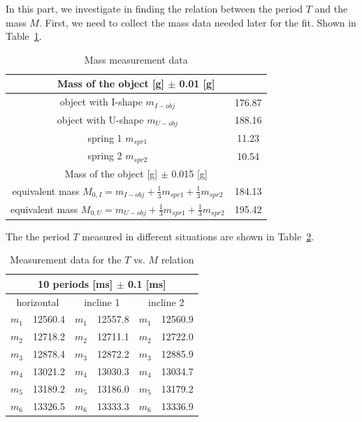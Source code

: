 In this part, we investigate in finding the relation between the period $T$ and 
the mass $M$.
First, we need to collect the mass data needed later for the fit. Shown in Table~\ref{dataMass}.

\begin{table}[H]
	\centering
	\begin{tabular}{|c|c|}
	\hline
	\multicolumn{2}{|c|}{Mass of the object [g] $\pm$ 0.01 [g]} \\ \hline
	object with I-shape $m_{I-obj}$  & 176.87 \\ \hline
	object with U-shape $m_{U-obj}$  & 188.16 \\ \hline
	spring 1 			$m_{spr1}$ & 11.23 \\ \hline
	spring 2 			$m_{spr2}$ & 10.54 \\ \hline \hline
	\multicolumn{2}{|c|}{Mass of the object [g] $\pm$ 0.015 [g]} \\ \hline 
	equivalent mass		$M_{0,I} = m_{I-obj} + \frac{1}{3} m_{spr1} + \frac{1}{3} m_{spr2} $ & 184.13 \\ \hline 
	equivalent mass		$M_{0,U} = m_{U-obj} + \frac{1}{3} m_{spr1} + \frac{1}{3} m_{spr2} $ & 195.42 \\ \hline 
	\end{tabular}
	\caption{Mass measurement data}
\label{dataMass}
\end{table}


The the period $T$ measured in different situations are shown in Table~\ref{dataTime}.

\begin{table}[H]
	\centering
	\begin{tabular}{|c|c||c|c||c|c|}
	\hline
	\multicolumn{6}{|c|}{10 periods [ms] $\pm$ 0.1 [ms]} \\ \hline
    \multicolumn{2}{|c||}{horizontal}  &
     \multicolumn{2}{|c||}{incline 1}  &
     \multicolumn{2}{|c|}{incline 2}  \\ \hline
	$m_1$ & 12560.4 & $m_1$ & 12557.8 & $m_1$ & 12560.9 \\ \hline
	$m_2$ & 12718.2 & $m_2$ & 12711.1 & $m_2$ & 12722.0 \\ \hline
	$m_3$ & 12878.4 & $m_3$ & 12872.2 & $m_3$ & 12885.9 \\ \hline
	$m_4$ & 13021.2 & $m_4$ & 13030.3 & $m_4$ & 13034.7 \\ \hline
	$m_5$ & 13189.2 & $m_5$ & 13186.0 & $m_5$ & 13179.2 \\ \hline
	$m_6$ & 13326.5 & $m_6$ & 13333.3 & $m_6$ & 13336.9 \\ \hline
	\end{tabular}
	\caption{Measurement data for the $T$ vs. $M$ relation}
\label{dataTime}
\end{table}

